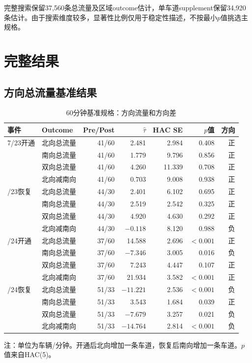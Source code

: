 \documentclass[11pt,a4paper]{ctexart}
\begin{document}
完整搜索保留37,560条总流量及区域outcome估计，单车道supplement保留34,920条估计。由于搜索维度较多，显著性比例仅用于稳定性描述，不按最小$p$值挑选主规格。

\section{完整结果}

\subsection{方向总流量基准结果}

\begin{table}[H]
\centering
\caption{60分钟基准规格：方向流量和方向差}
\label{tab:main_results}
\begin{threeparttable}
\begin{tabular}{llrrrrr}
\toprule
事件 & Outcome & Pre/Post & $\hat\tau$ & HAC SE & $p$值 & 方向 \\
\midrule
7/23开通 & 北向总流量 & 41/60 & 2.481 & 2.984 & 0.408 & 正 \\
            & 南向总流量 & 41/60 & 1.779 & 9.796 & 0.856 & 正 \\
            & 双向总流量 & 41/60 & 4.260 & 11.339 & 0.708 & 正 \\
            & 北向减南向 & 41/60 & 0.703 & 9.008 & 0.938 & 正 \\
\addlinespace
7/23恢复 & 北向总流量 & 44/30 & 2.401 & 6.102 & 0.695 & 正 \\
            & 南向总流量 & 44/30 & 2.519 & 2.542 & 0.325 & 正 \\
            & 双向总流量 & 44/30 & 4.920 & 4.630 & 0.292 & 正 \\
            & 北向减南向 & 44/30 & $-0.118$ & 8.120 & 0.988 & 负 \\
\addlinespace
7/24开通 & 北向总流量 & 37/60 & 14.588 & 2.696 & $<0.001$ & 正 \\
            & 南向总流量 & 37/60 & $-7.346$ & 3.005 & 0.016 & 负 \\
            & 双向总流量 & 37/60 & 7.243 & 4.447 & 0.107 & 正 \\
            & 北向减南向 & 37/60 & 21.934 & 3.582 & $<0.001$ & 正 \\
\addlinespace
7/24恢复 & 北向总流量 & 51/33 & $-11.221$ & 2.536 & $<0.001$ & 负 \\
            & 南向总流量 & 51/33 & 3.543 & 1.684 & 0.039 & 正 \\
            & 双向总流量 & 51/33 & $-7.679$ & 3.257 & 0.021 & 负 \\
            & 北向减南向 & 51/33 & $-14.764$ & 2.814 & $<0.001$ & 负 \\
\bottomrule
\end{tabular}
\begin{tablenotes}[flushleft]\footnotesize
\item 注：单位为车辆/分钟。开通后北向增加一条车道，恢复后南向增加一条车道。$p$值来自HAC(5)。
\end{tablenotes}
\end{threeparttable}
\end{table}
\end{document}
